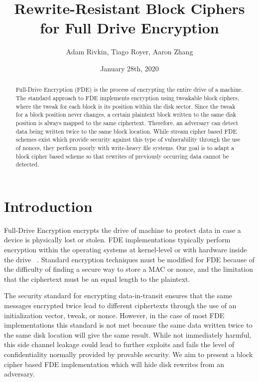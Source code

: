 \documentclass[11pt,twocolumn]{article}
\begin{document}
\title{
    Rewrite-Resistant Block Ciphers for Full Drive Encryption
}
\date{January 28th, 2020}
\author{Adam Rivkin, Tiago Royer, Aaron Zhang}
\maketitle

\begin{abstract}
    Full-Drive Encryption (FDE) is the process of encrypting the entire drive of a machine. The standard approach to FDE implements encryption using tweakable block ciphers, where the tweak for each block is its position within the disk sector. Since the tweak for a block position never changes, a certain plaintext block written to the same disk position is always mapped to the same ciphertext. Therefore, an adversary can detect data being written twice to the same block location. While stream cipher based FDE schemes exist which provide security against this type of vulnerability through the use of nonces, they perform poorly with write-heavy file systems. Our goal is to adapt a block cipher based scheme so that rewrites of previously occurring data cannot be detected.
\end{abstract}

\section*{Introduction}

Full-Drive Encryption encrypts the drive of machine to protect data in case a device is physically lost or stolen. FDE implementations typically perform encryption within the operating systems at kernel-level or with hardware inside the drive ~\cite{muller2014systematic}. Standard encryption techniques must be modified for FDE because of the difficulty of finding a secure way to store a MAC or nonce, and the limitation that the ciphertext must be an equal length to the plaintext.

The security standard for encrypting data-in-transit ensures that the same messages encrypted twice lead to different ciphertexts through the use of an initialization vector, tweak, or nonce. However, in the case of most FDE implementations this standard is not met because the same data written twice to the same disk location will give the same result. While not immediately harmful, this side channel leakage could lead to further exploits and fails the level of confidentiality normally provided by provable security. We aim to present a block cipher based FDE implementation which will hide disk rewrites from an adversary.
\end{document}
